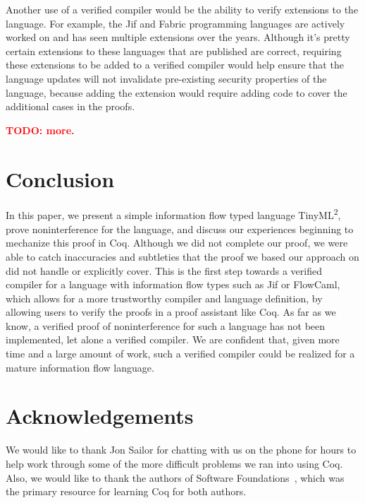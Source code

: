 \documentclass[a4paper,twocolumn]{article}
\newcommand{\langName}[0]{TinyML\textsuperscript{2}}
\newcommand{\todo}[1]{\textbf{\textcolor{red}{TODO: #1}}}
\theoremstyle{plain}
\theoremstyle{definition}
\begin{document}
Another use of a verified compiler would be the ability to verify extensions to
the language.  For example, the Jif and Fabric programming languages are
actively worked on and has seen multiple extensions over the years.  Although
it's pretty certain extensions to these languages that are published are
correct, requiring these extensions to be added to a verified compiler would
help ensure that the language updates will not invalidate pre-existing security
properties of the language, because adding the extension would require adding
code to cover the additional cases in the proofs.

\todo{more.}

\section{Conclusion}
\label{sec:conclusion}

In this paper, we present a simple information flow typed language \langName,
prove noninterference for the language, and discuss our experiences beginning to
mechanize this proof in Coq.  Although we did not complete our proof, we were
able to catch inaccuracies and subtleties that the proof we based our approach
on did not handle or explicitly cover.  This is the first step towards a
verified compiler for a language with information flow types such as Jif or
FlowCaml, which allows for a more trustworthy compiler and language definition,
by allowing users to verify the proofs in a proof assistant like Coq.  As far as
we know, a verified proof of noninterference for such a language has not been
implemented, let alone a verified compiler.  We are confident that, given more
time and a large amount of work, such a verified compiler could be realized for
a mature information flow language.

\section*{Acknowledgements}

We would like to thank Jon Sailor for chatting with us on the phone for hours to
help work through some of the more difficult problems we ran into using Coq.
Also, we would like to thank the authors of Software
Foundations~\cite{Pierce:sf}, which was the primary resource for learning Coq
for both authors.



\end{document}
